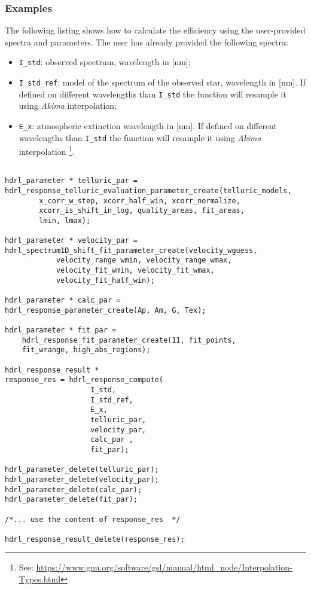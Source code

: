 \subsubsection{Examples}
The following listing shows how to calculate the efficiency using the user-provided spectra and parameters.
The user has already provided the following spectra:
\begin{itemize}
\item \verb+I_std+: observed spectrum, wavelength in [nm];
\item \verb+I_std_ref+: model of the spectrum of the observed star, wavelength in [nm]. If defined on different wavelengths than \verb+I_std+ the function will resample it using \textit{Akima} interpolation;
\item \verb+E_x+: atmospheric extinction wavelength in [nm]. If defined on different wavelengths than \verb+I_std+ the function will resample it using \textit{Akima} interpolation \footnote{See: \url{https://www.gnu.org/software/gsl/manual/html_node/Interpolation-Types.html}}.
\end{itemize}
\begin{lstlisting}

hdrl_parameter * telluric_par = 
hdrl_response_telluric_evaluation_parameter_create(telluric_models,
        x_corr_w_step, xcorr_half_win, xcorr_normalize, 
        xcorr_is_shift_in_log, quality_areas, fit_areas, 
        lmin, lmax);

hdrl_parameter * velocity_par = 
hdrl_spectrum1D_shift_fit_parameter_create(velocity_wguess,
    		velocity_range_wmin, velocity_range_wmax, 
    		velocity_fit_wmin, velocity_fit_wmax, 
    		velocity_fit_half_win);
    		
hdrl_parameter * calc_par = 
hdrl_response_parameter_create(Ap, Am, G, Tex);

hdrl_parameter * fit_par =
    hdrl_response_fit_parameter_create(11, fit_points, 
	fit_wrange, high_abs_regions);

hdrl_response_result *
response_res = hdrl_response_compute(
            		I_std, 
            		I_std_ref,
            		E_x,
            		telluric_par,
            		velocity_par,
            		calc_par ,
            		fit_par);

hdrl_parameter_delete(telluric_par);
hdrl_parameter_delete(velocity_par);
hdrl_parameter_delete(calc_par);
hdrl_parameter_delete(fit_par);

/*... use the content of response_res  */

hdrl_response_result_delete(response_res);

\end{lstlisting}

